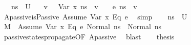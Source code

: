 \begin{isabellebody}
\ \ {\isacharparenleft}{\kern0pt}\ {\isachardoublequoteopen}ns{\isacharprime}{\kern0pt}\ {\isasymin}\ {\isacharquery}{\kern0pt}U{\isacharprime}{\kern0pt}{\isachardoublequoteclose}{\isacharparenright}{\kern0pt}\isanewline
\ \ \ {\isachardoublequoteopen}{\isasymexists}v{\isachardot}{\kern0pt}\ {\isacharparenleft}{\kern0pt}{\isasymLambda}{\isacharcomma}{\kern0pt}{\isasymGamma}{\isacharcomma}{\kern0pt}{\isasymOmega}\ {\isasymturnstile}\ {\isasymlangle}Var\ x{\isacharcomma}{\kern0pt}\ ns{\isacharprime}{\kern0pt}{\isasymrangle}\ {\isasymDown}\ v{\isacharparenright}{\kern0pt}\ {\isasymand}\ {\isacharparenleft}{\kern0pt}{\isasymLambda}{\isacharcomma}{\kern0pt}{\isasymGamma}{\isacharcomma}{\kern0pt}{\isasymOmega}\ {\isasymturnstile}\ {\isasymlangle}e{}{\isacharcomma}{\kern0pt}\ ns{\isacharprime}{\kern0pt}{\isasymrangle}\ {\isasymDown}\ v{\isacharparenright}{\kern0pt}{\isachardoublequoteclose}\isanewline
%
\isadelimproof
%
\endisadelimproof
%
\isatagproof
{}\isamarkupfalse%
\ {\isacharminus}{\kern0pt}\isanewline
\ \ \isamarkupfalse%
\ Apassive{\isacharcolon}{\kern0pt}{\isachardoublequoteopen}isPassive\ {\isacharparenleft}{\kern0pt}Assume\ {\isacharparenleft}{\kern0pt}{\isacharparenleft}{\kern0pt}Var\ x{\isacharparenright}{\kern0pt}\ {\isasymguillemotleft}Eq{\isasymguillemotright}\ e{}{\isacharparenright}{\kern0pt}{\isacharparenright}{\kern0pt}{\isachardoublequoteclose}\ \isamarkupfalse%
\ simp\isanewline
\ \ \isamarkupfalse%
\ {\isacartoucheopen}ns{\isacharprime}{\kern0pt}\ {\isasymin}\ {\isacharquery}{\kern0pt}U{\isacharprime}{\kern0pt}{\isacartoucheclose}\ \isamarkupfalse%
\ {\isachardoublequoteopen}M{\isacharcomma}{\kern0pt}{\isasymLambda}{\isacharcomma}{\kern0pt}{\isasymGamma}{\isacharcomma}{\kern0pt}{\isasymOmega}\ {\isasymturnstile}\ {\isasymlangle}Assume\ {\isacharparenleft}{\kern0pt}Var\ x\ {\isasymguillemotleft}Eq{\isasymguillemotright}\ e{}{\isacharparenright}{\kern0pt}{\isacharcomma}{\kern0pt}\ Normal\ ns{\isacharprime}{\kern0pt}{\isasymrangle}\ {\isasymrightarrow}\ Normal\ ns{\isacharprime}{\kern0pt}{\isachardoublequoteclose}\isanewline
\ \ \ \ \isamarkupfalse%
\ passive{\isacharunderscore}{\kern0pt}states{\isacharunderscore}{\kern0pt}propagate{\isacharunderscore}{\kern0pt}{}{\isacharbrackleft}{\kern0pt}OF\ Apassive{\isacharbrackright}{\kern0pt}\ \isamarkupfalse%
\ blast\isanewline
\ \ \isamarkupfalse%
\ {\isacharquery}{\kern0pt}thesis\isanewline

\end{isabellebody}
